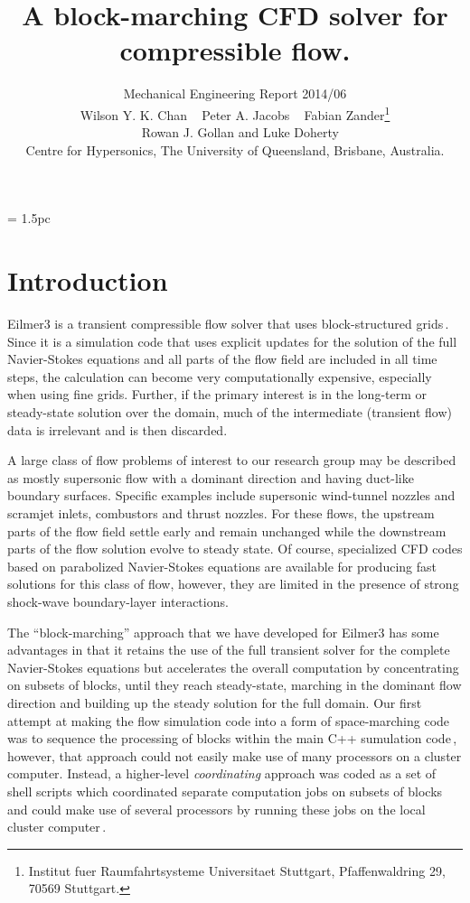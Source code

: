 \documentclass[12pt,a4paper,twoside]{article}
\title{
    A block-marching {CFD} solver for compressible flow.
}
\author{
    Mechanical Engineering Report 2014/06\\
    Wilson Y. K. Chan ~ Peter A. Jacobs  ~ Fabian Zander\thanks{Institut fuer Raumfahrtsysteme
      Universitaet Stuttgart, Pfaffenwaldring 29, 70569 Stuttgart.}\\
    ~ Rowan J. Gollan and Luke Doherty\\
    Centre for Hypersonics, The University of Queensland, Brisbane, Australia.
}
\begin{document}
\maketitle

\begin{abstract}

\end{abstract}

\cleardoublepage
\tableofcontents

\cleardoublepage
\baselineskip = 1.5pc

\section{Introduction}
%
Eilmer3 is a transient compressible flow solver that uses block-structured 
grids\,\cite{gollan_jacobs_2013a,jacobs_etal_2014a,jacobs_etal_2014b}.  
Since it is a simulation code that uses explicit updates for the solution 
of the full Navier-Stokes equations and all parts of the flow field are included in all time steps, 
the calculation can become very computationally expensive, especially when using fine grids.  
Further, if the primary interest is in the long-term or steady-state solution over the domain, 
much of the intermediate (transient flow) data is irrelevant and is then discarded.

\medskip
A large class of flow problems of interest to our research group may be described 
as mostly supersonic flow with a dominant direction and having duct-like boundary surfaces.  
Specific examples include supersonic wind-tunnel nozzles and scramjet inlets, combustors and thrust nozzles.  
For these flows, the upstream parts of the flow field settle early and remain unchanged 
while the downstream parts of the flow solution evolve to steady state.  
Of course, specialized CFD codes based on parabolized Navier-Stokes equations are available 
for producing fast solutions for this class of flow, however, 
they are limited in the presence of strong shock-wave boundary-layer interactions.

\medskip
The “block-marching” approach that we have developed for Eilmer3 has some advantages 
in that it retains the use of the full transient solver for 
the complete Navier-Stokes equations but accelerates the overall computation 
by concentrating on subsets of blocks, until they reach steady-state, 
marching in the dominant flow direction and building up the steady solution for the full domain. 
Our first attempt at making the flow simulation code into a form of space-marching code
was to sequence the processing of blocks within the main C++ sumulation code\,\cite{zander_etal_2011b},
however, that approach could not easily make use of many processors on a cluster computer. 
Instead, a higher-level \textit{coordinating} approach was coded 
as a set of shell scripts which coordinated separate computation jobs on subsets of blocks
and could make use of several processors by running these jobs on the local cluster computer\,\cite{chan_2012a}.  
\end{document}
